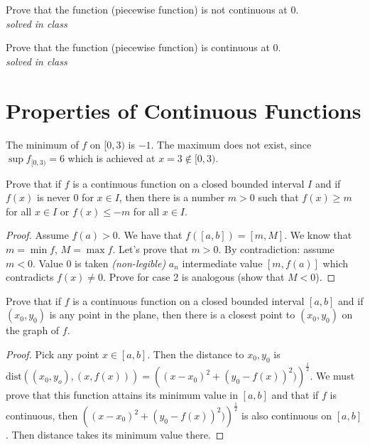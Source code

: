\documentclass[12pt]{book}
\newenvironment{exercise}[2][Exercise]{\begin{trivlist}
\item[\hskip \labelsep {\bfseries #1}\hskip \labelsep {\bfseries #2.}]}{\end{trivlist}}
\begin{document}
\begin{exercise}{3.1.11}
Prove that the function (piecewise function) is not continuous at 0.\\

\emph{solved in class}
\end{exercise}

\begin{exercise}{3.1.12}
Prove that the function (piecewise function) is continuous at 0.\\

\emph{solved in class}
\end{exercise}


\section{Properties of Continuous Functions}

\begin{exercise}{3.2.1}
The minimum of $f$ on $[0, 3)$ is $-1$. The maximum does not exist, since $\sup f_{[0,3)} = 6$ which is achieved at $x=3 \not \in [0,3)$.
\end{exercise}

\begin{exercise}{3.2.2}
    Prove that if $f$ is a continuous function on a closed bounded interval $I$ and if $f(x)$ is never 0 for $x \in I$, then there is a number $m>0$ such that $f(x)\geq m$ for all $x \in I$ or $f(x) \leq -m$ for all $x \in I$.

    \begin{proof}
    Assume $f(a)>0$. We have that $f([a,b])=[m,M]$. We know that $m=\min f$, $M=\max f$. Let's prove that $m>0$. By contradiction: assume $m<0$. Value 0 is taken \emph{(non-legible)} $a_n$ intermediate value $[m, f(a)]$ which contradicts $f(x)\neq 0$. Prove for case 2 is analogous (show that $M <0$).
    \end{proof}
\end{exercise}

\begin{exercise}{3.2.3}
    Prove that if $f$ is a continuous function on a closed bounded interval $[a,b]$ and if $(x_0, y_0)$ is any point in the plane, then there is a closest point to $(x_0,y_0)$ on the graph of $f$.

    \begin{proof}
    Pick any point $x \in [a,b]$. Then the distance to $x_0,y_0$ is $\text{dist}\left( (x_0,y_o), (x,f(x)) \right) = \left( (x-x_0)^2 + (y_0-f(x))^2)\right)^{\frac{1}{2}}$. We must prove that this function attains its minimum value in $[a,b]$ and that if $f$ is continuous, then $\left( (x-x_0)^2 + (y_0-f(x))^2)\right)^{\frac{1}{2}}$ is also continuous on $[a,b]$. Then distance takes its minimum value there.
    \end{proof}
\end{exercise}
\end{document}
